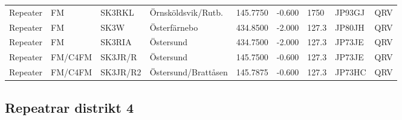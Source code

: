 \begin{landscape}
\begin{longtable}{llllrrlll}
	Repeater          & FM              & SK3RKL   & Örnsköldsvik/Rutb.  &     145.7750 &     -0.600 & 1750               & JP93GJ      & QRV      \\
	Repeater          & FM              & SK3W     & Österfärnebo        &     434.8500 &     -2.000 & 127.3              & JP80JH      & QRV      \\
	Repeater          & FM              & SK3RIA   & Östersund           &     434.7500 &     -2.000 & 127.3              & JP73JE      & QRV      \\
	Repeater          & FM/C4FM         & SK3JR/R  & Östersund           &     145.7500 &     -0.600 & 127.3              & JP73JE      & QRV      \\
	Repeater          & FM/C4FM         & SK3JR/R2 & Östersund/Brattåsen &     145.7875 &     -0.600 & 127.3              & JP73HC      & QRV
\end{longtable}


\clearpage

\subsection{Repeatrar distrikt 4}



\end{landscape}

